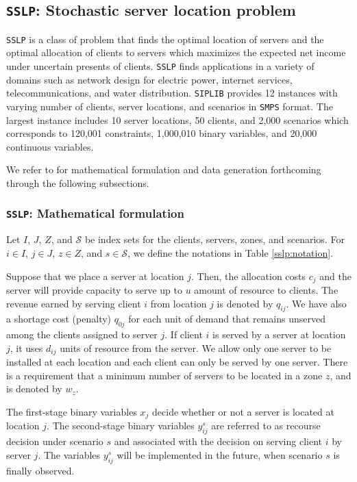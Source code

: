 \subsection{\texttt{SSLP}: Stochastic server location problem} \label{SSLP}
\texttt{SSLP} is a class of problem that finds the optimal location of servers and the optimal allocation of clients to servers which maximizes the expected net income under uncertain presents of clients. \texttt{SSLP} finds applications in a variety of domains such as network design for electric power, internet services, telecommunications, and water distribution. \texttt{SIPLIB} provides 12 instances with varying number of clients, server locations, and scenarios in \texttt{SMPS} format. The largest instance includes 10 server locations, 50 clients, and 2,000 scenarios which corresponds to 120,001 constraints, 1,000,010 binary variables, and 20,000 continuous variables.

We refer to \cite{journal:NS2005} for mathematical formulation and data generation forthcoming through the following subsections.


\subsubsection{\texttt{SSLP}: Mathematical formulation}
Let $I$, $J$, $Z$, and $\mathcal{S}$ be index sets for the clients, servers, zones, and scenarios. For $i\in I$, $j\in J$, $z\in Z$, and $s\in\mathcal{S}$, we define the notations in Table \ref{sslp:notation}.

Suppose that we place a server at location $j$. Then, the allocation costs $c_j$ and the server will provide capacity to serve up to $u$ amount of resource to clients. The revenue earned by serving client $i$ from location $j$ is denoted by $q_{ij}$. We have also a shortage cost (penalty) $q_{0j}$ for each unit of demand that remains unserved among the clients assigned to server $j$. If client $i$ is served by a server at location $j$, it uses $d_{ij}$ units of resource from the server. We allow only one server to be installed at each location and each client can only be served by one server. There is a requirement that a minimum number of servers to be located in a zone $z$, and is denoted by $w_z$. 

The first-stage binary variables $x_j$ decide whether or not a server is located at location $j$. The second-stage binary variables $y_{ij}^s$ are referred to as recourse decision under scenario $s$ and associated with the decision on serving client $i$ by server $j$. The variables $y_{ij}^s$ will be implemented in the future, when scenario $s$ is finally observed.

